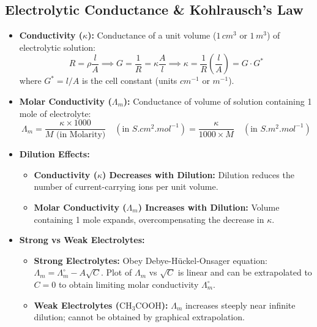 \documentclass[10pt,a4paper]{article}
\begin{document}
\subsection{Electrolytic Conductance \& Kohlrausch's Law}
\begin{itemize}
  \item \textbf{Conductivity ($\kappa$):} Conductance of a unit volume ($1\,\si{cm^3}$ or $1\,\si{m^3}$) of electrolytic solution:
  \begin{equation}
    R = \rho \frac{l}{A} \implies G = \frac{1}{R} = \kappa \frac{A}{l} \implies \kappa = \frac{1}{R}\left(\frac{l}{A}\right) = G \cdot G^*
  \end{equation}
  where $G^* = l/A$ is the cell constant (units $\si{cm^{-1}}$ or $\si{m^{-1}}$).
  \item \textbf{Molar Conductivity ($\Lambda_m$):} Conductance of volume of solution containing 1 mole of electrolyte:
  \begin{equation}
    \Lambda_m = \frac{\kappa \times 1000}{M\text{ (in Molarity)}} \quad (\text{in }\si{S.cm^2.mol^{-1}}) = \frac{\kappa}{1000 \times M} \quad (\text{in }\si{S.m^2.mol^{-1}})
  \end{equation}
  \item \textbf{Dilution Effects:}
  \begin{itemize}
    \item \textbf{Conductivity ($\kappa$) Decreases with Dilution:} Dilution reduces the number of current-carrying ions per unit volume.
    \item \textbf{Molar Conductivity ($\Lambda_m$) Increases with Dilution:} Volume containing 1 mole expands, overcompensating the decrease in $\kappa$.
  \end{itemize}
  \item \textbf{Strong vs Weak Electrolytes:}
  \begin{itemize}
    \item \textbf{Strong Electrolytes:} Obey Debye-Hückel-Onsager equation: $\Lambda_m = \Lambda_m^\circ - A\sqrt{C}$. Plot of $\Lambda_m$ vs $\sqrt{C}$ is linear and can be extrapolated to $C = 0$ to obtain limiting molar conductivity $\Lambda_m^\circ$.
    \item \textbf{Weak Electrolytes ($\mathrm{CH_3COOH}$):} $\Lambda_m$ increases steeply near infinite dilution; cannot be obtained by graphical extrapolation.
  \end{itemize}
\end{itemize}
\end{document}
